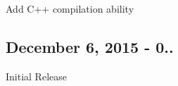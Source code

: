 
\begin{DoxyItemize}
\item Add C++ compilation ability
\end{DoxyItemize}

\subsection*{December 6, 2015 -\/ 0..}

Initial Release 